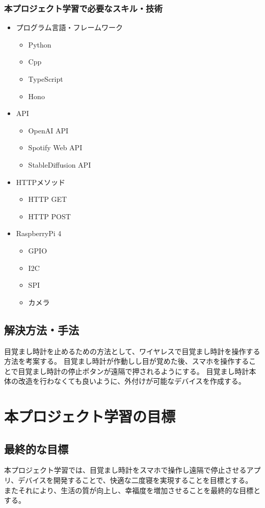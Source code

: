 \subsection{本プロジェクト学習で必要なスキル・技術}
\begin{itemize}
  \item プログラム言語・フレームワーク
  \begin{itemize}
    \item Python
    \item Cpp
    \item TypeScript
    \item Hono
  \end{itemize}
  \item API
  \begin{itemize}
    \item OpenAI API
    \item Spotify Web API
    \item StableDiffusion API
  \end{itemize}
  \item HTTPメソッド
  \begin{itemize}
    \item HTTP GET
    \item HTTP POST
  \end{itemize}
  \item RaspberryPi 4
  \begin{itemize}
    \item GPIO
    \item I2C
    \item SPI
    \item カメラ
  \end{itemize}
\end{itemize}

\section{解決方法・手法}
目覚まし時計を止めるための方法として、ワイヤレスで目覚まし時計を操作する方法を考案する。
目覚まし時計が作動しし目が覚めた後、スマホを操作することで目覚まし時計の停止ボタンが遠隔で押されるようにする。
目覚まし時計本体の改造を行わなくても良いように、外付けが可能なデバイスを作成する。

\chapter{本プロジェクト学習の目標}
\section{最終的な目標}
本プロジェクト学習では、目覚まし時計をスマホで操作し遠隔で停止させるアプリ、デバイスを開発することで、快適な二度寝を実現することを目標とする。
またそれにより、生活の質が向上し、幸福度を増加させることを最終的な目標とする。

